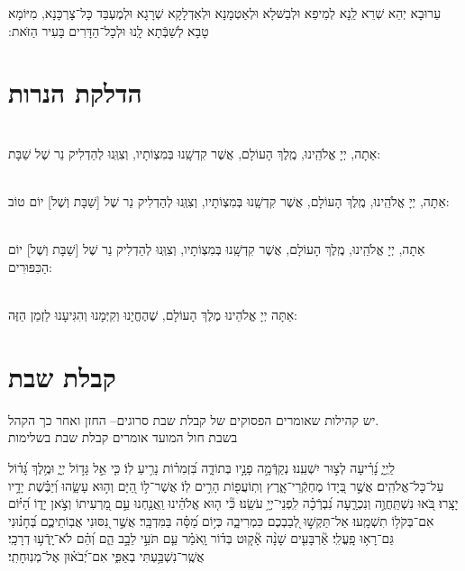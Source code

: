 \documentclass[twoside, openany, parskip=half, 11pt]{book}
\begin{document}
 עֵרוּבָא יְהֵא שְׁרֵא לַֽנָא לְמֵיפֵא וּלְבַשּּׁלָא וּלְאַטְמָנָא וּלְאַדְלָקָא שְׁרָגָא וּלְמֶעְבַּד כָּל־צָרְכָּנָא, מִיּוֹמָא טָבָא לְשַׁבְּֿתָא לָֽנוּ וּלְכָל־הַדָּרִים בָּעִיר הַזּׂאת:‏


\vspace{\baselineskip}
{\let\clearpage\relax 
\chapter[הדלקת הנרות שבת ויום טוב]{ הדלקת הנרות }}
 
\\
 אַתָה, יְיָ אֱלֹהֵֽינוּ, מֶֽלֶךְ הָעוֹלָם, אֲשֶׁר קִדְשָֽׁנוּ בְּמִצְוֹתָיו, וְצִוְּֽנוּ לְהַדְלִיק נֵר שֶׁל שַׁבָּת:

\\
 אַתָה, יְיָ אֱלֹהֵֽינוּ, מֶֽלֶךְ הָעוֹלָם, אֲשֶׁר קִדְשָֽׁנוּ בְּמִצְוֹתָיו, וְצִוְּֽנוּ לְהַדְלִיק נֵר שֶׁל
[שַׁבָּת וְשֶׁל] יוֹם טוֹב:

\\
 אַתָה, יְיָ אֱלֹהֵֽינוּ, מֶֽלֶךְ הָעוֹלָם, אֲשֶׁר קִדְשָֽׁנוּ בְּמִצְוֹתָיו, וְצִוְּֽנוּ לְהַדְלִיק נֵר שֶׁל
[שַׁבָּת וְשֶׁל] יוֹם הַכִּפּוּרִים:

\\
 אַתָּה יְיָ אֱלֹהֵינוּ מֶלֶךְ הָעוֹלָם, שֶׁהֶחֱיָנוּ וְקִיְּמָנוּ וְהִגִּיעָנוּ לַזְמַן הַזֶּה:



\chapter[קבלת שבת]{ קבלת שבת }
\label{kabalas_shabbos}


\begin{scriptsize}
\textsf{יש קהילות שאומרים הפסוקים של קבלת שבת סרוגים-- החזן ואחר כך הקהל.\\
בשבת חול המועד אומרים קבלת שבת בשלימות}

\end{scriptsize}

 לַֽיְיָ֑ נָ֝רִ֗יעָה לְצ֣וּר יִשְׁעֵֽנוּ׃ 
 נְקַדְּֿמָ֣ה פָנָ֣יו בְּתוֹדָ֑ה בִּ֝זְמִר֗וֹת נָרִ֥יעַ לֽוֹ׃ 
 כִּ֤י אֵ֣ל גָּד֣וֹל יְיָ֑ וּמֶ֥לֶךְ גָּ֝ד֗וֹל עַל־כָּל־אֱלֹהִֽים׃ 
 אֲשֶׁ֣ר בְּ֭יָדוֹ מֶחְקְֿרֵי־אָ֑רֶץ וְתֽוֹעֲפ֖וֹת הָרִ֣ים לֽוֹ׃ 
 אֲשֶׁר־ל֣וֹ הַ֭יָּם וְה֣וּא עָשָׂ֑הוּ וְ֝יַבֶּ֗שֶׁת יָדָ֥יו יָצָֽרוּ׃ 
 בֹּ֭אוּ נִשְׁתַּֽחֲוֶ֣ה וְנִכְרָ֑עָה נִ֝בְרְֿכָ֗ה לִֽפְנֵי־יְיָ֥ עֹשֵֽׂנוּ׃ 
 כִּ֘י ה֤וּא אֱלֹהֵ֗ינוּ וַֽאֲנַ֤חְנוּ עַ֣ם מַ֭רְעִיתוֹ וְצֹ֣אן יָד֑וֹ הַ֝יּ֗וֹם אִם־בְּקֹל֥וֹ תִשְׁמָֽעוּ׃ 
 אַל־תַּקְשׁ֣וּ לְ֭בַבְכֶם כִּמְרִיבָ֑ה כְּי֥וֹם מַ֝סָּ֗ה בַּמִּדְבָּֽר׃ 
 אֲשֶׁ֣ר נִ֭סּוּנִי אֲבֽוֹתֵיכֶ֑ם בְּ֝חָנ֗וּנִי גַּם־רָא֥וּ פָֽעֳלִֽי׃ 
 אַ֘רְבָּעִ֤ים שָׁנָ֨ה אָ֘ק֤וּט בְּד֗וֹר וָֽאֹמַ֗ר עַ֤ם תֹּעֵ֣י לֵבָ֣ב הֵ֑ם וְ֝הֵ֗ם לֹא־יָֽדְֿע֥וּ דְרָכָֽי׃ 
 אֲשֶֽׁר־נִשְׁבַּ֥עְתִּי בְאַפִּ֑י אִם־יְ֝בֹא֗וּן אֶל־מְנֽוּחָתִֽי׃
\end{document}
